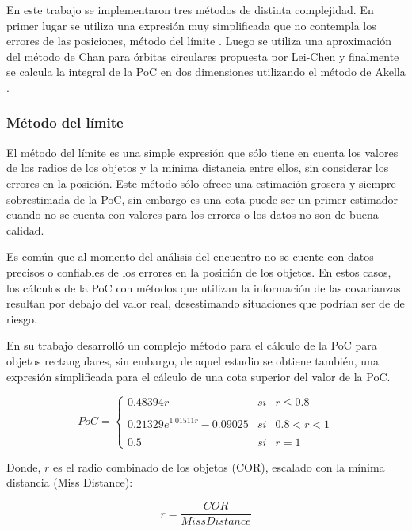 En este trabajo se implementaron tres m\'etodos de distinta complejidad. En primer lugar se utiliza una expresi\'on muy simplificada que no contempla los errores de las posiciones, m\'etodo del l\'imite  \citep{alfano2008method}. Luego se utiliza una aproximaci\'on del m\'etodo de Chan \citep{chan2003improved} para \'orbitas circulares propuesta por Lei-Chen \citep{leichen} y finalmente se calcula la integral de la PoC en dos dimensiones utilizando el m\'etodo de Akella \citep{akellaAlfriend}.

\subsubsection{M\'etodo del l\'imite}
El m\'etodo del l\'imite es una simple expresi\'on que s\'olo tiene en cuenta los valores de los radios de los objetos y la m\'inima distancia entre ellos, sin considerar los errores en la posici\'on. Este m\'etodo s\'olo ofrece una estimaci\'on grosera y siempre sobrestimada de la PoC, sin embargo es una cota puede ser un primer estimador cuando no se cuenta con valores para los errores o los datos no son de buena calidad. 

Es com\'un que al momento del an\'alisis  del encuentro no se cuente con datos precisos o confiables de los errores en la posici\'on de los objetos. En estos casos, los c\'alculos de la PoC con m\'etodos que utilizan la informaci\'on de las covarianzas resultan por debajo del valor real, desestimando situaciones que podr\'ian ser de de riesgo. 

En su trabajo \citep{alfano2008method} desarroll\'o un complejo m\'etodo para el c\'alculo de la PoC para objetos rectangulares, sin embargo, de aquel estudio se obtiene tambi\'en, una expresi\'on simplificada para el c\'alculo de una cota superior del valor de la PoC. 

$$
PoC= \left\{ \begin{array}{lcc}
             0.48394 r &   si  & r \leq 0.8 \\
             \\ 0.21329 e^{1.01511 r}-0.09025 &  si & 0.8 < r < 1 \\
             \\ 0.5 &  si  & r = 1
             \end{array}
   \right.
$$

Donde, $r$ es el radio combinado de los objetos (COR), escalado con la m\'inima distancia (Miss Distance): 

$$
 r = \frac{COR}{Miss Distance}
$$

